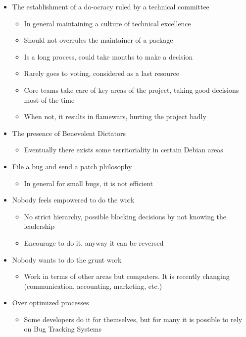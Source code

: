 \documentclass[11pt]{article} %
\begin{document}
  	\begin{itemize}
  	  \item The establishment of a do-ocracy ruled by a technical committee
	  	\begin{itemize}
	  	  \item In general maintaining a culture of technical excellence
	  	  \item Should not overrules the maintainer of a package
	  	  \item Is a long process, could take months to make a decision
	  	  \item Rarely goes to voting, considered as a last resource
	  	  \item Core teams take care of key areas of the project, taking good decisions most of the time
	  	  \item When not, it results in flamewars, hurting the project badly
	  	\end{itemize}
  	  \item The presence of Benevolent Dictators
	  	\begin{itemize}
	  	  \item Eventually there exists some territoriality in certain Debian areas
	  	\end{itemize}
  	  \item File a bug and send a patch philosophy 
	\begin{itemize}
	  	  \item In general for small bugs, it is not efficient
	  	\end{itemize}
  	  \item Nobody feels empowered to do the work
	  	\begin{itemize}
	  	  \item No strict hierarchy, possible blocking decisions by not knowing the leadership
	  	  \item Encourage to do it, anyway it can be reversed
	  	\end{itemize}  	  
  	  \item Nobody wants to do the grunt work
	  	\begin{itemize}
	  	  \item Work in terms of other areas but computers. It is recently changing (communication, accounting, marketing, etc.)
	  	\end{itemize}
  	  \item Over optimized processes
	  	\begin{itemize}
	  	  \item Some developers do it for themselves, but for many it is possible to rely on Bug Tracking Systems

\end{itemize}
\end{itemize}
\end{document}
